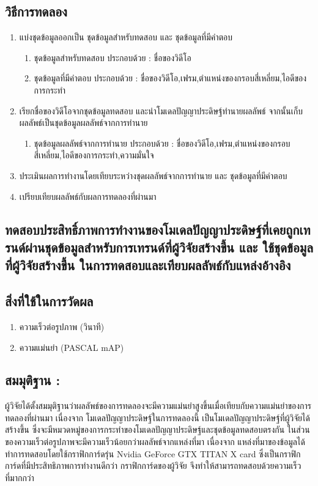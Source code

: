 \subsection*{วิธีการทดลอง}
	\begin{enumerate}
		\item แบ่งชุดข้อมูลออกเป็น ชุดข้อมูลสำหรับทดสอบ และ ชุดข้อมูลที่มีคำตอบ
			\begin{enumerate}
				\item ชุดข้อมูลสำหรับทดสอบ ประกอบด้วย : ชื่อของวิดีโอ
				\item ชุดข้อมูลที่มีคำตอบ ประกอบด้วย : ชื่อของวิดีโอ,เฟรม,ตำแหน่งของกรอบสี่เหลี่ยม,ไอดีของการกระทำ
			\end{enumerate}
		\item เรียกชื่อของวิดีโอจากชุดข้อมูลทดสอบ และนำโมเดลปัญญาประดิษฐ์ทำนายผลลัพธ์ จากนั้นเก็บผลลัพธ์เป็นชุดข้อมูลผลลัพธ์จากการทำนาย
			\begin{enumerate}
				\item ชุดข้อมูลผลลัพธ์จากการทำนาย ประกอบด้วย : ชื่อของวิดีโอ,เฟรม,ตำแหน่งของกรอบสี่เหลี่ยม,ไอดีของการกระทำ,ความมั่นใจ
			\end{enumerate}
		\item ประเมินผลการทำงานโดยเทียบระหว่างชุดผลลัพธ์จากการทำนาย และ ชุดข้อมูลที่มีคำตอบ	
		\item เปรียบเทียบผลลัพธ์กับผลการทดลองที่ผ่านมา
\end{enumerate}
\clearpage
\subsection{ทดสอบประสิทธิ์ภาพการทำงานของโมเดลปัญญาประดิษฐ์ที่เคยถูกเทรนด์ผ่านชุดข้อมูลสำหรับการเทรนด์ที่ผู้วิจัยสร้างขึ้น และ ใช้ชุดข้อมูลที่ผู้วิจัยสร้างขึ้น ในการทดสอบและเทียบผลลัพธ์กับแหล่งอ้างอิง}
\subsection*{สิ่งที่ใช้ในการวัดผล}
	\begin{enumerate}
		\item ความเร็วต่อรูปภาพ (วินาที)
		\item ความแม่นยำ (PASCAL mAP)
	\end{enumerate}
\subsection*{สมมุติฐาน :}ผู้วิจัยได้ตั้งสมมุติฐานว่าผลลัพธ์ของการทดลองจะมีความแม่นยำสูงขึ้นเมื่อเทียบกับความแม่นยำของการทดลองที่ผ่านมา เนื่องจาก โมเดลปัญญาประดิษฐ์ในการทดลองนี้ เป็นโมเดลปัญญาประดิษฐ์ที่ผู้วิจัยได้สร้างขึ้น ซึ่งจะมีหมวดหมู่ของการกระทำของโมเดลปัญญาประดิษฐ์และชุดข้อมูลทดสอบตรงกัน ในส่วนของความเร็วต่อรูปภาพจะมีความเร็วน้อยกว่าผลลัพธ์จากแหล่งที่มา เนื่องจาก แหล่งที่มาของข้อมูลได้ทำการทดสอบโดยใช้กราฟิกการ์ดรุ่น Nvidia GeForce GTX TITAN X card ซึ่งเป็นกราฟิกการ์ดที่มีประสิทธิภาพการทำงานดีกว่า กราฟิกการ์ดของผู้วิจัย จึงทำให้สามารถทดสอบด้วยความเร็วที่มากกว่า
